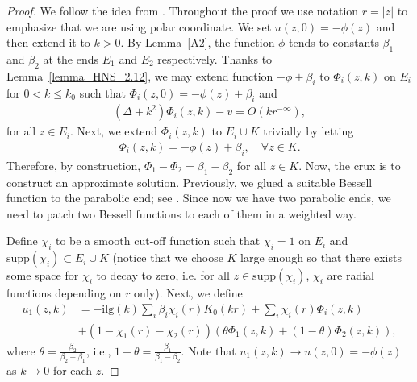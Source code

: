 \documentclass[12pt]{amsart}
\begin{document}
\begin{proof}
We follow the idea from \cite[Lemma~2.14]{HNS}. Throughout the proof we use notation $r=|z|$ to emphasize that we are using polar coordinate. We set $u(z,0) = -\phi(z)$ and then extend it to $k>0$. By Lemma~\ref{A2}, the function $\phi$ tends to constants $\beta_1$ and $\beta_2$  at the ends $E_1$ and $E_2$ respectively. Thanks to Lemma~\ref{lemma_HNS_2.12}, we may extend function $-\phi+\beta_i$ to $\Phi_i(z,k)$ on $E_i$ for $0<k\le k_0$ such that $\Phi_i(z,0) = -\phi(z)+\beta_i$ and
\begin{align*}
    (\Delta+k^2)\Phi_i(z,k) - v = O(k r^{-\infty}),
\end{align*}
for all $z\in E_i$. Next, we extend $\Phi_i(z,k)$ to $E_i \cup K$ trivially by letting 
\begin{align*}
    \Phi_i(z,k) = - \phi(z) + \beta_i, \quad \forall z\in K.
\end{align*}
Therefore, by construction, $\Phi_1 - \Phi_2 = \beta_1 - \beta_2$ for all $z\in K$. Now, the crux is to construct an approximate solution. Previously, we glued a suitable Bessell function to the parabolic end; see \cite[Lemma~2.14]{HNS}. Since now we have two parabolic ends, we need to patch two Bessell functions to each of them in a weighted way.

Define $\chi_i$ to be a smooth cut-off function such that $\chi_i = 1$ on $E_i$ and $\textrm{supp}(\chi_i) \subset E_i \cup K$ (notice that we choose $K$ large enough so that there exists some space for $\chi_i$ to decay to zero, i.e. for all $z\in \textrm{supp}(\chi_i)$, $\chi_i$ are radial functions depending on $r$ only). Next, we define
\begin{align}\label{eq_u1}
    u_1(z,k) &= -\textrm{ilg}(k) \sum_i \beta_i \chi_i(r) K_0(kr) + \sum_i \chi_i(r) \Phi_i(z,k) \\ \nonumber
    &+ \left(1-\chi_1(r)-\chi_2(r) \right) \left(\theta \Phi_1(z,k) + (1-\theta) \Phi_2(z,k)\right),
\end{align}
where $\theta = \frac{\beta_2}{\beta_2 - \beta_1}$, i.e., $1-\theta = \frac{\beta_1}{\beta_1-\beta_2}$. Note that $u_1(z,k) \to u(z,0) = - \phi(z)$ as $k\to 0$ for each $z$.


\end{proof}
\end{document}
